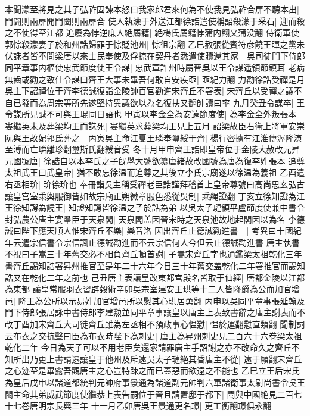 本聞濛至將見之其子弘祚固諫本怒曰我家郎君來何為不使我見弘祚合扉不聽本出|{
	門闢則兩扉開門闔則兩扉合}
使人執濛于外送江都徐誥遣使稱詔殺濛于采石|{
	迎而殺之不使得至江都}
追廢為悖逆庶人絶屬籍|{
	絶楊氏屬籍悖蒲内翻又蒲没翻}
侍衛軍使郭悰殺濛妻子於和州誥歸罪于悰貶池州|{
	悰徂宗翻}
乙巳赦張從賓符彦饒王暉之黨未伏誅者皆不問梁唐以來士民奉使及俘掠在契丹者悉遣使贖還其家　吳司徒門下侍郎同平章事内樞使忠武節度使王令謀|{
	忠武軍許州時屬晉吳以王令謀遥領節鎮耳}
老病無齒或勸之致仕令謀曰齊王大事未畢吾何敢自安疾亟|{
	亟紀力翻}
力勸徐誥受禪是月吳主下詔禪位于齊李德誠復詣金陵帥百官勸進宋齊丘不署表|{
	宋齊丘以受禪之議不自已發而為周宗等所先遂堅持異議欲以為名復扶又翻帥讀曰率}
九月癸丑令謀卒|{
	王令謀所見誠不可與王琨同日語也}
甲寅以李金全為安遠節度使|{
	為李金全外叛張本}
婁繼英未及葬梁均王而誅死|{
	婁繼英求葬梁均王見上五月}
詔梁故臣右衛上將軍安崇阮與王故妃郭氏葬之　丙寅吳主命江夏王璘奉璽綬于齊|{
	楊行密據有江淮傳渥隆演至溥而亡璘離珍翻璽斯氏翻綬音受}
冬十月甲申齊王誥即皇帝位于金陵大赦改元昇元國號唐|{
	徐誥自以本李氏之子旣舉大號欲纂唐緒故改國號為唐為復李姓張本}
追尊太祖武王曰武皇帝|{
	猶不敢忘徐温而追尊之其後立李氏宗廟遂以徐温為義祖}
乙酉遣右丞相玠|{
	玠徐玠也}
奉冊詣吳主稱受禪老臣誥謹拜稽首上皇帝尊號曰高尚思玄弘古讓皇宫室乘輿服御皆如故宗廟正朔徽章服色悉從吳制|{
	乘䋲證翻}
丁亥立徐知證為江王徐知諤為饒王|{
	知證知諤皆徐温之子於誥為弟}
以吳太子璉領平盧節度使兼中書令封弘農公唐主宴羣臣于天泉閣|{
	天泉閣盖因晉宋時之天泉池故地起閣因以為名}
李德誠曰陛下應天順人惟宋齊丘不樂|{
	樂音洛}
因出齊丘止德誠勸進書　|{
	考異曰十國紀年云遣宗信書令宗信諷止德誠勸進而不云宗信何人今但云止德誠勸進書}
唐主執書不視曰子嵩三十年舊交必不相負齊丘頓首謝|{
	子嵩宋齊丘字也通鑑梁太祖乾化三年書齊丘謁知誥署昇州推官至是年二十六年今日三十年舊交盖乾化二年署推官而謁知誥又在乾化二年之前也}
己丑唐主表讓皇改東都宫殿名皆取于仙經|{
	唐都金陵以江都為東都}
讓皇常服羽衣習辟糓術辛卯吳宗室建安王珙等十二人皆降爵為公而加官增邑|{
	降王為公所以示易姓加官增邑所以慰其心珙居勇翻}
丙申以吳同平章事張延翰及門下侍郎張居詠中書侍郎李建勲並同平章事讓皇以唐主上表致書辭之唐主謝表而不改丁酉加宋齊丘大司徒齊丘雖為左丞相不預政事心愠懟|{
	愠於運翻懟直類翻}
聞制詞云布衣之交抗聲曰臣為布衣時陛下為刺史|{
	唐主為昇州刺史見二百六十六卷梁太祖乾化二年}
今日為天子可以不用老臣矣還家請罪唐主手詔謝之亦不改命久之齊丘不知所出乃更上書請遷讓皇于他州及斥遠吳太子璉絶其昏唐主不從|{
	遠于願翻宋齊丘之心迹至是畢露吾觀唐主之心豈特踈之而已蓋惡而欲遠之不能也}
乙巳立王后宋氏為皇后戊申以諸道都統判元帥府事景通為諸道副元帥判六軍諸衛事太尉尚書令吳王　閩主命其弟威武節度使繼恭上表告嗣位于晉且請置邸于都下|{
	閩與中國絶見二百七十七卷唐明宗長興三年}
十一月乙卯唐吳王景通更名璟|{
	更工衡翻璟俱永翻}
